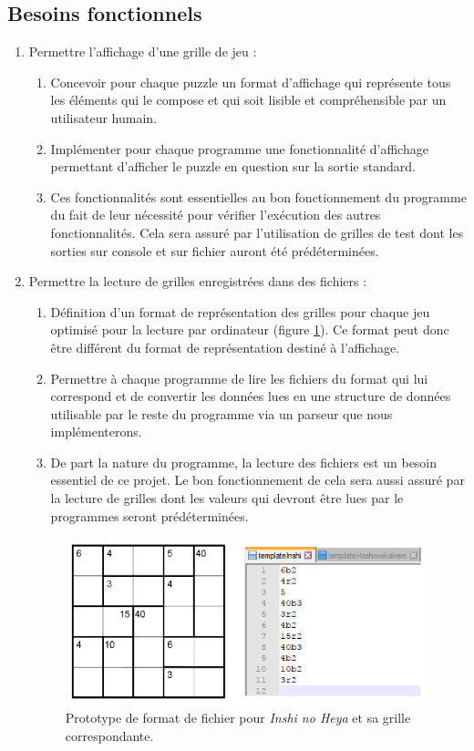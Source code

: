 \documentclass[12pt]{article}
\begin{document}
\subsection{Besoins fonctionnels}
\begin{enumerate}
\itemsep1em

\item  \label{besoinF1}Permettre l'affichage d'une grille de jeu :
\begin{enumerate}
\item Concevoir pour chaque puzzle un format d'affichage qui représente tous les éléments qui le compose et qui soit lisible et compréhensible par un utilisateur humain.
\item Implémenter pour chaque programme une fonctionnalité d'affichage permettant d'afficher le puzzle en question sur la sortie standard.
\item \label{besoinF1c}Ces fonctionnalités sont essentielles au bon fonctionnement du programme du fait de leur nécessité pour vérifier l'exécution des autres fonctionnalités. Cela sera assuré par l'utilisation de grilles de test dont les sorties sur console et sur fichier auront été prédéterminées.
\end{enumerate}

\item \label{besoinF2}Permettre la lecture de grilles enregistrées dans des fichiers :
\begin{enumerate}
\item \label{besoinF2a}Définition d'un format de représentation des grilles pour chaque jeu optimisé pour la lecture par ordinateur (figure \ref{fig:inshiTemplate}). Ce format peut donc être différent du format de représentation destiné à l'affichage.
\item \label{besoinF2b}Permettre à chaque programme de lire les fichiers du format qui lui correspond et de convertir les données lues en une structure de données utilisable par le reste du programme via un parseur que nous implémenterons.
\item De part la nature du programme, la lecture des fichiers est un besoin essentiel de ce projet. Le bon fonctionnement de cela sera aussi assuré par la lecture de grilles dont les valeurs qui devront être lues par le programmes seront prédéterminées.
\end{enumerate}

\begin{figure}[H]
\caption{Prototype de format de fichier pour \textit{Inshi no Heya} et sa grille correspondante.}
\label{fig:inshiTemplate}
\centering
\includegraphics[width=.85\textwidth]{inshiTemp}
\end{figure}


\end{enumerate}
\end{document}
